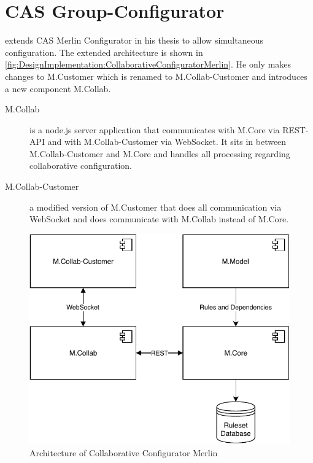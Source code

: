 \section{CAS Group-Configurator}
\label{sec:DesignImplementation:GroupConfigurator}

\citeauthor{raabKollaborativeProduktkonfigurationEchtzeit2019} extends CAS Merlin Configurator in his thesis to allow simultaneous configuration. The extended architecture is shown in \autoref{fig:DesignImplementation:CollaborativeConfiguratorMerlin}.
He only makes changes to M.Customer which is renamed to M.Collab-Customer and introduces a new component M.Collab.

\begin{description}
    \item[M.Collab] is a node.js server application that communicates with M.Core via REST-API and with M.Collab-Customer via WebSocket. It sits in between M.Collab-Customer and M.Core and handles all processing regarding collaborative configuration.
    \item[M.Collab-Customer] a modified version of M.Customer that does all communication via WebSocket and does communicate with M.Collab instead of M.Core.
\end{description}

\begin{figure}
    \centering
    \includegraphics{./figures/MerlinCollaborativeConfigurator.pdf}
    \caption{Architecture of Collaborative Configurator Merlin \cite[Fig. 4.3]{raabKollaborativeProduktkonfigurationEchtzeit2019}}
    \label{fig:DesignImplementation:CollaborativeConfiguratorMerlin}
\end{figure}


